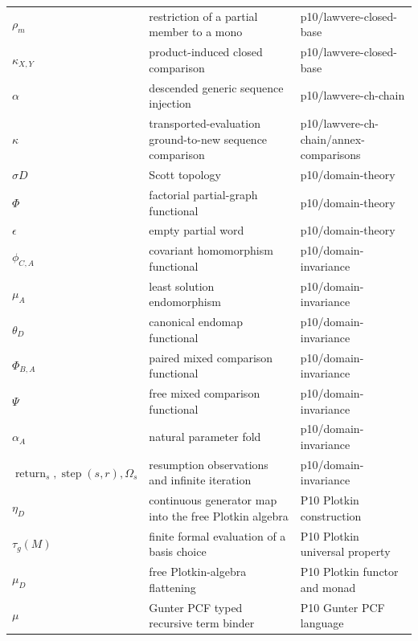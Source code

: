 \begin{longtable}{@{}p{}p{}p{}@{}}
\(\rho_m\) & restriction of a partial member to a mono & p10/\allowbreak{}lawvere-\allowbreak{}closed-\allowbreak{}base \\
\(\kappa_{X,Y}\) & product-induced closed comparison & p10/\allowbreak{}lawvere-\allowbreak{}closed-\allowbreak{}base \\
\(\alpha\) & descended generic sequence injection & p10/\allowbreak{}lawvere-\allowbreak{}ch-\allowbreak{}chain \\
\(\kappa\) & transported-evaluation ground-to-new sequence comparison & p10/\allowbreak{}lawvere-\allowbreak{}ch-\allowbreak{}chain/\allowbreak{}annex-\allowbreak{}comparisons \\
\(\sigma D\) & Scott topology & p10/\allowbreak{}domain-\allowbreak{}theory \\
\(\Phi\) & factorial partial-graph functional & p10/\allowbreak{}domain-\allowbreak{}theory \\
\(\epsilon\) & empty partial word & p10/\allowbreak{}domain-\allowbreak{}theory \\
\(\phi_{C,A}\) & covariant homomorphism functional & p10/\allowbreak{}domain-\allowbreak{}invariance \\
\(\mu_A\) & least solution endomorphism & p10/\allowbreak{}domain-\allowbreak{}invariance \\
\(\theta_D\) & canonical endomap functional & p10/\allowbreak{}domain-\allowbreak{}invariance \\
\(\Phi_{B,A}\) & paired mixed comparison functional & p10/\allowbreak{}domain-\allowbreak{}invariance \\
\(\Psi\) & free mixed comparison functional & p10/\allowbreak{}domain-\allowbreak{}invariance \\
\(\alpha_A\) & natural parameter fold & p10/\allowbreak{}domain-\allowbreak{}invariance \\
\(\operatorname{return}_s,\allowbreak \operatorname{step}(s,\allowbreak r),\allowbreak \Omega_s\) & resumption observations and infinite iteration & p10/\allowbreak{}domain-\allowbreak{}invariance \\
\(\eta_D\) & continuous generator map into the free Plotkin algebra & P10 Plotkin construction \\
\(\tau_g(M)\) & finite formal evaluation of a basis choice & P10 Plotkin universal property \\
\(\mu_D\) & free Plotkin-algebra flattening & P10 Plotkin functor and monad \\
\(\mu\) & Gunter PCF typed recursive term binder & P10 Gunter PCF language \\

\end{longtable}
